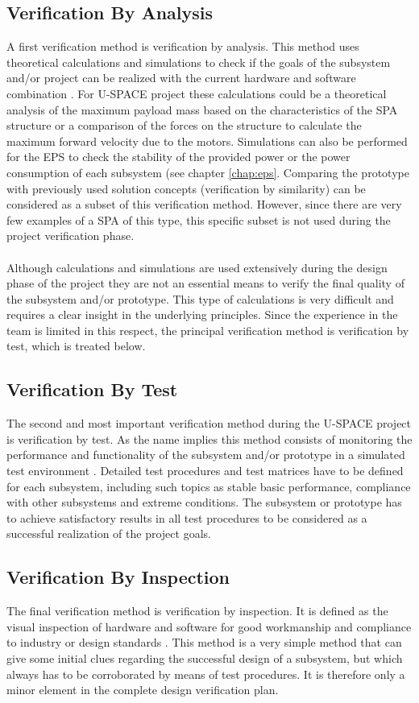 \subsection{Verification By Analysis}
%
A first verification method is verification by analysis. This method uses theoretical calculations and simulations to check if the goals of the subsystem and/or project can be realized with the current hardware and software combination \cite{ECSS_verification}. For \ac{U-SPACE} project these calculations could be a theoretical analysis of the maximum payload mass based on the characteristics of the \ac{SPA} structure or a comparison of the forces on the structure to calculate the maximum forward velocity due to the motors. Simulations can also be performed for the \ac{EPS} to check the stability of the provided power or the power consumption of each subsystem (see chapter \ref{chap:eps}. Comparing the prototype with previously used solution concepts (verification by similarity) can be considered as a subset of this verification method. However, since there are very few examples of a \ac{SPA} of this type, this specific subset is not used during the project verification phase.
\\
\\
Although calculations and simulations are used extensively during the design phase of the project they are not an essential means to verify the final quality of the subsystem and/or prototype. This type of calculations is very difficult and requires a clear insight in the underlying principles. Since the experience in the team is limited in this respect, the principal verification method is verification by test, which is treated below.
%
\subsection{Verification By Test}
%
The second and most important verification method during the \ac{U-SPACE} project is verification by test. As the name implies this method consists of monitoring the performance and functionality of the subsystem and/or prototype in a simulated test environment \cite{ECSS_verification}. Detailed test procedures and test matrices have to be defined for each subsystem, including such topics as stable basic performance, compliance with other subsystems and extreme conditions. The subsystem or prototype has to achieve satisfactory results in all test procedures to be considered as a successful realization of the project goals.
%
\subsection{Verification By Inspection}
%
The final verification method is verification by inspection. It is defined as the visual inspection of hardware and software for good workmanship and compliance to industry or design standards \cite{ECSS_verification}. This method is a very simple method that can give some initial clues regarding the successful design of a subsystem, but which always has to be corroborated by means of test procedures. It is therefore only a minor element in the complete design verification plan.
%
%
